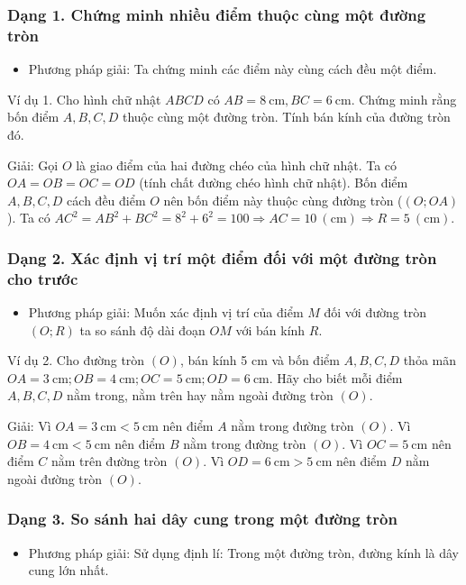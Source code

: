 \documentclass[%
    fontsize=12pt,%
    chapterprefix=false,%
    open=right,%
    twoside=false,%
    numbers=noenddot,%
    headings=optiontohead,%
    final,%
    DIV=15,%
    parskip=half %
]{scrbook}
\begin{document}
\subsubsection{Dạng 1. Chứng minh nhiều điểm thuộc cùng một đường tròn}

\begin{itemize}
  \item Phương pháp giải: Ta chứng minh các điểm này cùng cách đều một điểm.
\end{itemize}

Ví dụ 1. Cho hình chữ nhật $ABCD$ có $AB = 8\ \text{cm}, BC = 6\ \text{cm}$.     Chứng minh rằng bốn điểm $A, B, C, D$ thuộc cùng một đường tròn.     Tính bán kính của đường tròn đó.

Giải: Gọi $O$ là giao điểm của hai đường chéo của hình chữ nhật. Ta có $OA = OB = OC = OD$ (tính chất đường chéo hình chữ nhật). Bốn điểm $A, B, C, D$ cách đều điểm $O$ nên bốn điểm này thuộc cùng đường tròn ($(O; OA)$). Ta có $AC^2 = AB^2 + BC^2 = 8^2 + 6^2 = 100 \Rightarrow AC = 10\ (\text{cm}) \Rightarrow R = 5\ (\text{cm})$.
\subsubsection{Dạng 2. Xác định vị trí một điểm đối với một đường tròn cho trước}

\begin{itemize}
  \item Phương pháp giải: Muốn xác định vị trí của điểm $M$ đối với đường tròn $(O; R)$ ta so sánh độ dài đoạn $OM$ với bán kính $R$.
\end{itemize}

Ví dụ 2. Cho đường tròn $(O)$, bán kính 5 cm và bốn điểm $A, B, C, D$ thỏa mãn $OA = 3\ \text{cm}; OB = 4\ \text{cm}; OC = 5\ \text{cm}; OD = 6\ \text{cm}$. Hãy cho biết mỗi điểm $A, B, C, D$ nằm trong, nằm trên hay nằm ngoài đường tròn $(O)$.

Giải: Vì $OA = 3\ \text{cm} < 5\ \text{cm}$ nên điểm $A$ nằm trong đường tròn $(O)$. Vì $OB = 4\ \text{cm} < 5\ \text{cm}$ nên điểm $B$ nằm trong đường tròn $(O)$. Vì $OC = 5\ \text{cm}$ nên điểm $C$ nằm trên đường tròn $(O)$. Vì $OD = 6\ \text{cm} > 5\ \text{cm}$ nên điểm $D$ nằm ngoài đường tròn $(O)$.
\subsubsection{Dạng 3. So sánh hai dây cung trong một đường tròn}

\begin{itemize}
  \item Phương pháp giải: Sử dụng định lí: Trong một đường tròn, đường kính là dây cung lớn nhất.
\end{itemize}
\end{document}
